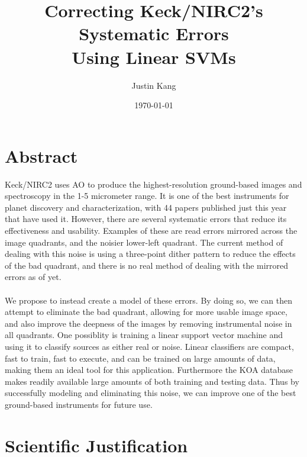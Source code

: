 \documentclass[12pt]{article}
\title{\Large \textbf{Correcting Keck/NIRC2's Systematic Errors \\ Using Linear SVMs}}
\author{Justin Kang}
\date{\today}
\begin{document}
\thispagestyle{empty}
\maketitle


\thispagestyle{empty}
\section*{Abstract}
\noindent Keck/NIRC2 uses AO to produce the highest-resolution ground-based images and spectroscopy in the 1-5 micrometer range. It is one of the best instruments for planet discovery and characterization, with 44 papers published just this year that have used it. However, there are several systematic errors that reduce its effectiveness and usability. Examples of these are read errors mirrored across the image quadrants, and the noisier lower-left quadrant. The current method of dealing with this noise is using a three-point dither pattern to reduce the effects of the bad quadrant, and there is no real method of dealing with the mirrored errors as of yet.\\\\ 
We propose to instead create a model of these errors. By doing so, we can then attempt to eliminate the bad quadrant, allowing for more usable image space, and also improve the deepness of the images by removing instrumental noise in all quadrants. One possiblity is training a linear support vector machine and using it to classify sources as either real or noise. Linear classifiers are compact, fast to train, fast to execute, and can be trained on large amounts of data, making them an ideal tool for this application. Furthermore the KOA database makes readily available large amounts of both training and testing data. Thus by successfully modeling and eliminating this noise, we can improve one of the best ground-based instruments for future use.


\newpage
\setcounter{page}{1}
\section*{Scientific Justification}
\end{document}
